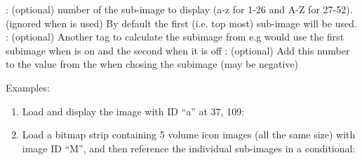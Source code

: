 {\begin{tagmap}
          : (optional) number of the sub-image to display (a-z for 1-26 and A-Z for 27-52). 
          (ignored when  is used)
          By default the first (i.e. top most) sub-image will be used.\newline
          : (optional) Another tag to calculate the subimage from e.g  would
          use the first subimage when  is on and the second when it is off\newline
          : (optional) Add this number to the value from the  when 
          chosing the subimage (may be negative)\\
  \end{tagmap}

Examples:
\begin{enumerate}
\item Load and display the image  with ID ``a'' at 37, 109:\\
\item Load a bitmap strip containing 5 volume icon images (all the same size)
with image ID ``M'', and then reference the individual sub-images in a conditional:\\
\\
\end{enumerate}


}

